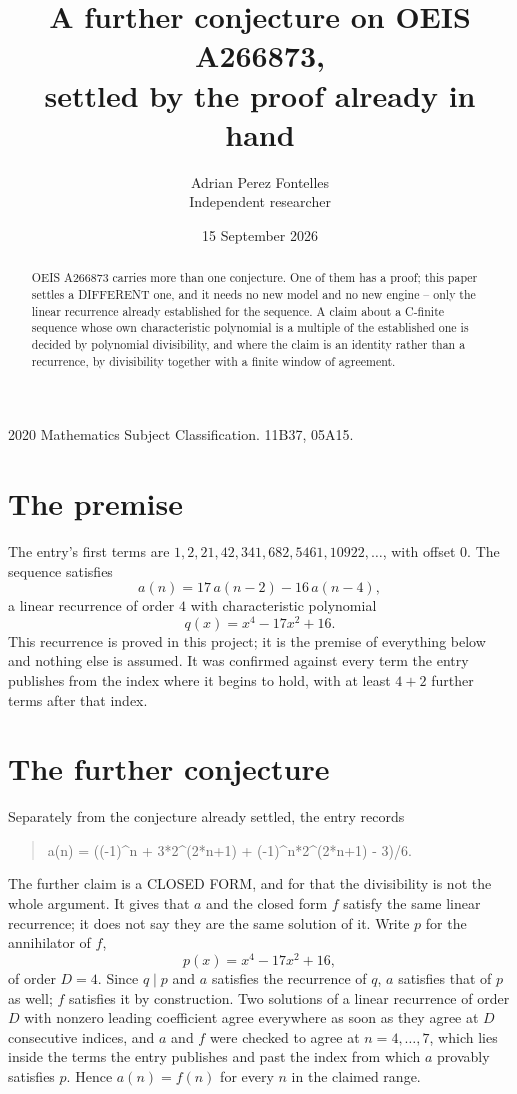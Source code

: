 \documentclass[11pt,a4paper]{article}
\title{A further conjecture on OEIS A266873,\\ \large settled by the proof already in hand}
\author{Adrian Perez Fontelles\\ \small Independent researcher}
\date{15 September 2026}
\theoremstyle{plain}
\theoremstyle{definition}
\begin{document}
\maketitle

\begin{abstract}
OEIS A266873 carries more than one conjecture. One of them has a proof; this paper settles a
DIFFERENT one, and it needs no new model and no new engine -- only the linear recurrence already
established for the sequence. A claim about a C-finite sequence whose own characteristic
polynomial is a multiple of the established one is decided by polynomial divisibility, and where
the claim is an identity rather than a recurrence, by divisibility together with a finite window
of agreement.
\end{abstract}

\noindent\small 2020 Mathematics Subject Classification. 11B37, 05A15.\normalsize

\section{The premise}

The entry's first terms are $1, 2, 21, 42, 341, 682, 5461, 10922,\dots$, with offset $0$. The sequence satisfies
\[
  a(n)=17\,a(n-2) - 16\,a(n-4) ,
\]
a linear recurrence of order $4$ with characteristic polynomial
\[
  q(x)=x^{4} - 17 x^{2} + 16 .
\]
This recurrence is proved in this project; it is the premise of everything below and nothing else is assumed.
It was confirmed against every term the entry publishes from the index where it begins to hold,
with at least $4+2$ further terms after that index.

\section{The further conjecture}

Separately from the conjecture already settled, the entry records

\begin{quote}\raggedright a(n) = ((-1)\^{}n + 3*2\^{}(2*n+1) + (-1)\^{}n*2\^{}(2*n+1) - 3)/6.\end{quote}

The further claim is a CLOSED FORM, and for that the divisibility is not the whole argument. It
gives that $a$ and the closed form $f$ satisfy the same linear recurrence; it does not say they
are the same solution of it. Write $p$ for the annihilator of $f$,
\[
  p(x)=x^{4} - 17 x^{2} + 16 ,
\]
of order $D=4$. Since $q\mid p$ and $a$ satisfies the recurrence of $q$, $a$ satisfies that of
$p$ as well; $f$ satisfies it by construction. Two solutions of a linear recurrence of order $D$
with nonzero leading coefficient agree everywhere as soon as they agree at $D$ consecutive
indices, and $a$ and $f$ were checked to agree at $n=4,\dots,7$,
which lies inside the terms the entry publishes and past the index from which $a$ provably
satisfies $p$. Hence $a(n)=f(n)$ for every $n$ in the claimed range.
\end{document}
